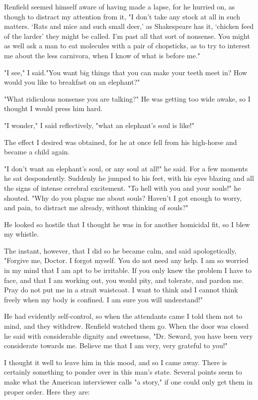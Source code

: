 Renfield seemed himself aware of having made a lapse, for he hurried on, as though to distract my attention from it, "I don't take any stock at all in such matters. `Rats and mice and such small deer,' as Shakespeare has it, `chicken feed of the larder' they might be called. I'm past all that sort of nonsense. You might as well ask a man to eat molecules with a pair of chopsticks, as to try to interest me about the less carnivora, when I know of what is before me." 

"I see," I said."You want big things that you can make your teeth meet in? How would you like to breakfast on an elephant?" 

"What ridiculous nonsense you are talking?" He was getting too wide awake, so I thought I would press him hard. 

"I wonder," I said reflectively, "what an elephant's soul is like!" 

The effect I desired was obtained, for he at once fell from his high-horse and became a child again. 

"I don't want an elephant's soul, or any soul at all!" he said. For a few moments he sat despondently. Suddenly he jumped to his feet, with his eyes blazing and all the signs of intense cerebral excitement. "To hell with you and your souls!" he shouted. "Why do you plague me about souls? Haven't I got enough to worry, and pain, to distract me already, without thinking of souls?" 

He looked so hostile that I thought he was in for another homicidal fit, so I blew my whistle. 

The instant, however, that I did so he became calm, and said apologetically, "Forgive me, Doctor. I forgot myself. You do not need any help. I am so worried in my mind that I am apt to be irritable. If you only knew the problem I have to face, and that I am working out, you would pity, and tolerate, and pardon me. Pray do not put me in a strait waistcoat. I want to think and I cannot think freely when my body is confined. I am sure you will understand!" 

He had evidently self-control, so when the attendants came I told them not to mind, and they withdrew. Renfield watched them go. When the door was closed he said with considerable dignity and sweetness, "Dr. Seward, you have been very considerate towards me. Believe me that I am very, very grateful to you!" 

I thought it well to leave him in this mood, and so I came away. There is certainly something to ponder over in this man's state. Several points seem to make what the American interviewer calls "a story," if one could only get them in proper order. Here they are: 

